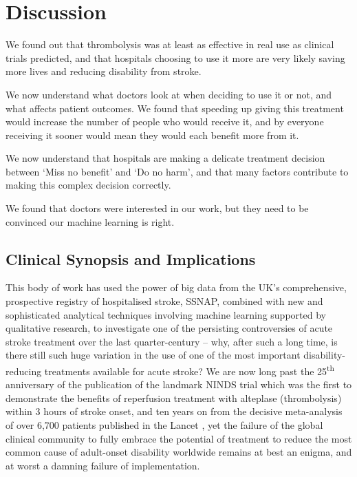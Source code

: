 \section{Discussion}

We found out that thrombolysis was at least as effective in real use as clinical trials predicted, and that hospitals choosing to use it more are very likely saving more lives and reducing disability from stroke. 

We now understand what doctors look at when deciding to use it or not, and what affects patient outcomes. We found that speeding up giving this treatment would increase the number of people who would receive it, and by everyone receiving it sooner would mean they would each benefit more from it. 

We now understand that hospitals are making a delicate treatment decision between ‘Miss no benefit’ and ‘Do no harm’, and that many factors contribute to making this complex decision correctly. 

We found that doctors were interested in our work, but they need to be convinced our machine learning is right.

\subsection{Clinical Synopsis and Implications}

This body of work has used the power of big data from the UK’s comprehensive, prospective registry of hospitalised stroke, SSNAP, combined with new and sophisticated analytical techniques involving machine learning supported by qualitative research, to investigate one of the persisting controversies of acute stroke treatment over the last quarter-century – why, after such a long time, is there still such huge variation in the use of one of the most important disability-reducing treatments available for acute stroke? We are now long past the 25\textsuperscript{th} anniversary of the publication of the landmark NINDS trial which was the first to demonstrate the benefits of reperfusion treatment with alteplase (thrombolysis) within 3 hours of stroke onset, and ten years on from the decisive meta-analysis of over 6,700 patients published in the Lancet \cite{emberson_effect_2014}, yet the failure of the global clinical community to fully embrace the potential of treatment to reduce the most common cause of adult-onset disability worldwide remains at best an enigma, and at worst a damning failure of implementation.

